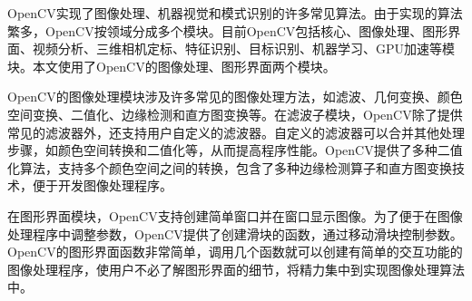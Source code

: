 OpenCV实现了图像处理、机器视觉和模式识别的许多常见算法。由于实现的算法繁多，OpenCV按领域分成多个模块。目前OpenCV包括核心、图像处理、图形界面、视频分析、三维相机定标、特征识别、目标识别、机器学习、GPU加速等模块。本文使用了OpenCV的图像处理、图形界面两个模块。

OpenCV的图像处理模块涉及许多常见的图像处理方法，如滤波、几何变换、颜色空间变换、二值化、边缘检测和直方图变换等。在滤波子模块，OpenCV除了提供常见的滤波器外，还支持用户自定义的滤波器。自定义的滤波器可以合并其他处理步骤，如颜色空间转换和二值化等，从而提高程序性能。OpenCV提供了多种二值化算法，支持多个颜色空间之间的转换，包含了多种边缘检测算子和直方图变换技术，便于开发图像处理程序。

在图形界面模块，OpenCV支持创建简单窗口并在窗口显示图像。为了便于在图像处理程序中调整参数，OpenCV提供了创建滑块的函数，通过移动滑块控制参数。OpenCV的图形界面函数非常简单，调用几个函数就可以创建有简单的交互功能的图像处理程序，使用户不必了解图形界面的细节，将精力集中到实现图像处理算法中。



